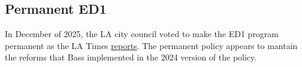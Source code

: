 \documentclass[12pt]{article}
\theoremstyle{definition}
\begin{document}
\subsection{Permanent ED1}
In December of 2025, the LA city council voted to make the ED1 program permanent as the LA Times \hyperlink{https://www.latimes.com/california/story/2025-12-09/la-city-council-passes-ordinance-to-streamline-affordable-housing}{reports}. The permanent policy appears to mantain the reforms that Bass implemented in the 2024 version of the policy.
\end{document}
